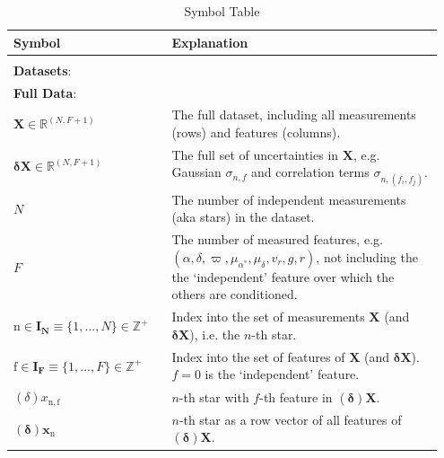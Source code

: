 \documentclass[twocolumn]{aastex631}
\newcommand{\mrm}[1]{\mathrm{#1}}
\newcommand{\mbs}[1]{\boldsymbol{#1}}
\newcommand{\mbf}[1]{\mathbf{#1}}
\newcommand{\mbb}[1]{\mathbb{#1}}
\newcommand{\nth}[1]{{#1}_{\mrm{n}}}  %
\newcommand{\parallax}{\varpi}
\begin{document}
    \begin{table}
    \centering
    \caption{Symbol Table}
    \label{table:symbol_table}
    \begin{tabular}{p{0.35\linewidth} p{0.6\linewidth}}
    Symbol                         & Explanation \\
    \toprule
    \\
    \multicolumn{2}{l}{\textbf{Datasets}:} \\
    \midrule
    \multicolumn{2}{l}{\textbf{Full Data}:}  \vspace{5pt} \\
    $\mbf{X} \in \mbb{R}^{(N, F+1)}$ & The full dataset, including all measurements (rows) and features (columns).  \\
    $\mbs{\delta}\mbf{X} \in \mbb{R}^{(N, F+1)}$ & The full set of uncertainties in $\mbf{X}$, e.g. Gaussian $\sigma_{n,f}$ and correlation terms $\sigma_{n,(f_i, f_j)}$.\\
    $N$ & The number of independent measurements (aka stars) in the dataset.  \\
    $F$ & The number of measured features, e.g. $(\alpha, \delta, \parallax, \mu_{\alpha^*}, \mu_\delta, v_r, g, r)$,  not including the the `independent' feature over which the others are conditioned. \\
    $\mrm{n} \in \mbs{I_N} \equiv \{1, ..., N\} \in \mbb{Z^+}$ & Index into the set of measurements $\mbf{X}$ (and $\mbs{\delta}\mbf{X}$), i.e. the $n$-th star. \\
    $\mrm{f} \in \mbs{I_F}  \equiv \{1, ..., F\} \in \mbb{Z^+}$ & Index into the set of features of $\mbf{X}$  (and $\mbs{\delta}\mbf{X}$). $ f=0$ is the `independent' feature.\\
    $(\delta)x_{\mrm{n,f}}$ & $n$-th star with $f$-th feature in $(\mbs{\delta})\mbf{X}$. \\
    $(\mbs{\delta})\nth{\mbs{x}}$ & $n$-th star as a row vector of all features of $(\mbs{\delta})\mbf{X}$. \\
    

\end{tabular}
\end{table}
\end{document}
